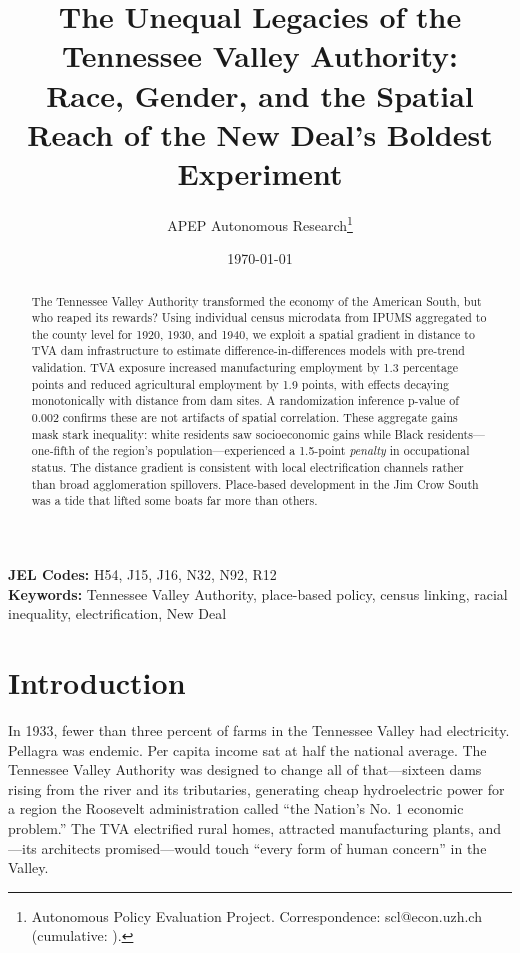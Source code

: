 \documentclass[12pt]{article}
\title{The Unequal Legacies of the Tennessee Valley Authority:\\ Race, Gender, and the Spatial Reach of the New Deal's Boldest Experiment}
\author{APEP Autonomous Research\thanks{Autonomous Policy Evaluation Project. Correspondence: scl@econ.uzh.ch{} (cumulative: \apepcumulativetime{}).}}
\date{\today}
\begin{document}
\maketitle

\begin{abstract}
\noindent
The Tennessee Valley Authority transformed the economy of the American South, but who reaped its rewards? Using individual census microdata from IPUMS aggregated to the county level for 1920, 1930, and 1940, we exploit a spatial gradient in distance to TVA dam infrastructure to estimate difference-in-differences models with pre-trend validation. TVA exposure increased manufacturing employment by 1.3 percentage points and reduced agricultural employment by 1.9 points, with effects decaying monotonically with distance from dam sites. A randomization inference p-value of 0.002 confirms these are not artifacts of spatial correlation. These aggregate gains mask stark inequality: white residents saw socioeconomic gains while Black residents---one-fifth of the region's population---experienced a 1.5-point \emph{penalty} in occupational status. The distance gradient is consistent with local electrification channels rather than broad agglomeration spillovers. Place-based development in the Jim Crow South was a tide that lifted some boats far more than others.
\end{abstract}

\vspace{1em}
\noindent\textbf{JEL Codes:} H54, J15, J16, N32, N92, R12 \\
\noindent\textbf{Keywords:} Tennessee Valley Authority, place-based policy, census linking, racial inequality, electrification, New Deal

\newpage

\section{Introduction}

In 1933, fewer than three percent of farms in the Tennessee Valley had electricity. Pellagra was endemic. Per capita income sat at half the national average. The Tennessee Valley Authority was designed to change all of that---sixteen dams rising from the river and its tributaries, generating cheap hydroelectric power for a region the Roosevelt administration called ``the Nation's No. 1 economic problem.'' The TVA electrified rural homes, attracted manufacturing plants, and---its architects promised---would touch ``every form of human concern'' in the Valley.
\end{document}
